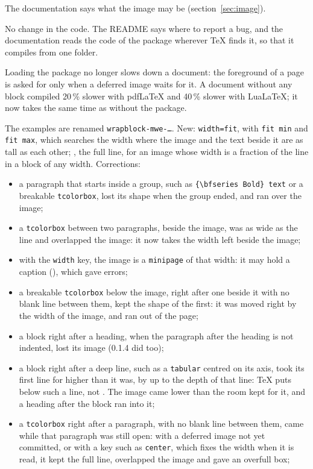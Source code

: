 \documentclass[a4paper,11pt]{article}
\newcommand\key[1]{\texttt{#1}}
\providecommand\env[1]{\texttt{#1}}
\begin{document}
\begin{description}
  The documentation says what the image may be (section~\ref{sec:image}).
\item[0.1.3 (18 November 2026)] No change in the code. The README says where to report a bug, and the documentation reads the code of the package wherever \TeX{} finds it, so that it compiles from one folder.
\item[0.1.4 (19 November 2026)] Loading the package no longer slows down a document: the foreground of a page is asked for only when a deferred image waits for it. A document without any block compiled 20\,\% slower with pdf\LaTeX{} and 40\,\% slower with Lua\LaTeX{}; it now takes the same time as without the package.
\item[0.1.5 (26 November 2026)] The examples are renamed \texttt{wrapblock-mwe-\dots}. New: \key{width=fit}, with \key{fit min} and \key{fit max}, which searches the width where the image and the text beside it are as tall as each other; , the full line, for an image whose width is a fraction of the line in a block of any width. Corrections:
  \begin{itemize}
  \item a paragraph that starts inside a group, such as \verb|{\bfseries Bold} text| or a breakable \env{tcolorbox}, lost its shape when the group ended, and ran over the image;
  \item a \env{tcolorbox} between two paragraphs, beside the image, was as wide as the line and overlapped the image: it now takes the width left beside the image;
  \item with the \key{width} key, the image is a \env{minipage} of that width: it may hold a caption (), which gave errors;
  \item a breakable \env{tcolorbox} below the image, right after one beside it with no blank line between them, kept the shape of the first: it was moved right by the width of the image, and ran out of the page;
  \item a block right after a heading, when the paragraph after the heading is not indented, lost its image (0.1.4 did too);
  \item a block right after a deep line, such as a \env{tabular} centred on its axis, took its first line for higher than it was, by up to the depth of that line: \TeX{} puts  below such a line, not . The image came lower than the room kept for it, and a heading after the block ran into it;
  \item a \env{tcolorbox} right after a paragraph, with no blank line between them, came while that paragraph was still open: with a deferred image not yet committed, or with a key such as \texttt{center}, which fixes the width when it is read, it kept the full line, overlapped the image and gave an overfull box;

\end{itemize}
\end{description}
\end{document}
